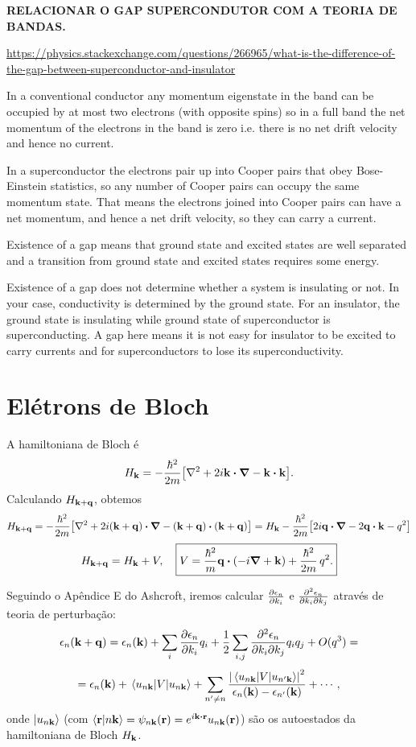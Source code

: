 \documentclass[a4paper,10pt]{article}
\begin{document}
\textbf{RELACIONAR O GAP SUPERCONDUTOR COM A TEORIA DE BANDAS.}


\url{https://physics.stackexchange.com/questions/266965/what-is-the-difference-of-the-gap-between-superconductor-and-insulator}

In a conventional conductor any momentum eigenstate in the band can be occupied by at most two electrons (with opposite spins) so in a full band the net momentum of the electrons in the band is zero i.e. there is no net drift velocity and hence no current.

In a superconductor the electrons pair up into Cooper pairs that obey Bose-Einstein statistics, so any number of Cooper pairs can occupy the same momentum state. That means the electrons joined into Cooper pairs can have a net momentum, and hence a net drift velocity, so they can carry a current.

Existence of a gap means that ground state and excited states are well separated and a transition from ground state and excited states requires some energy.

Existence of a gap does not determine whether a system is insulating or not. In your case, conductivity is determined by the ground state. For an insulator, the ground state is insulating while ground state of superconductor is superconducting. A gap here means it is not easy for insulator to be excited to carry currents and for superconductors to lose its superconductivity.



\pagebreak

\section{Elétrons de Bloch}

A hamiltoniana de Bloch é
$$
H_{\k} = -\frac{\hbar^2}{2m} \qty[\laplacian + 2i \k \vdot \grad - \k \vdot \k].
$$
Calculando $H_{\vb{k} + \vb{q}}$, obtemos
$$
H_{\k + \q} = -\frac{\hbar^2}{2m} \qty[\laplacian + 2i (\k + \q) \vdot \grad - (\k + \q) \vdot (\k + \q)] =
H_{\k} - \frac{\hbar^2}{2m} \qty[2 i \q \vdot \grad - 2 \q \vdot \k - q^2]
$$
$$
H_{\k + \q} = H_{\k} + V, \quad \boxed{V = \frac{\hbar^2}{m} \q \vdot \qty(-i \grad + \k) + \frac{\hbar^2}{2m} \, q^2.}
$$

Seguindo o Apêndice E do Ashcroft, iremos calcular $\pdv{\epsilon_n}{k_i}$ e $\pdv{\epsilon_n}{k_i}{k_j}$ através de teoria de perturbação:
$$
\epsilon_n(\vb{k}+\vb{q}) = \epsilon_n(\vb{k}) + \sum_{i} \pdv{\epsilon_n}{k_i} q_i +
\frac{1}{2} \sum_{i,j} \pdv{\epsilon_n}{k_i}{k_j} q_i q_j + O(q^3) =
$$
$$
= \eps_n(\k) + \ev{V}{u_{n\k}} + \sum_{n' \neq n} \frac{\abs{\mel{u_{n\k}}{V}{u_{n'\k}}}^2}{\eps_n(\k) - \eps_{n'}(\k)} + \cdots,
$$
onde $\ket{u_{n\vb{k}}}$ (com $\braket{\r}{n\k} = \psi_{n\k}(\r) = e^{i\k\vdot\r} u_{n\k}(\r)$) são os autoestados da hamiltoniana de Bloch $H_{\vb{k}}$.
\end{document}
